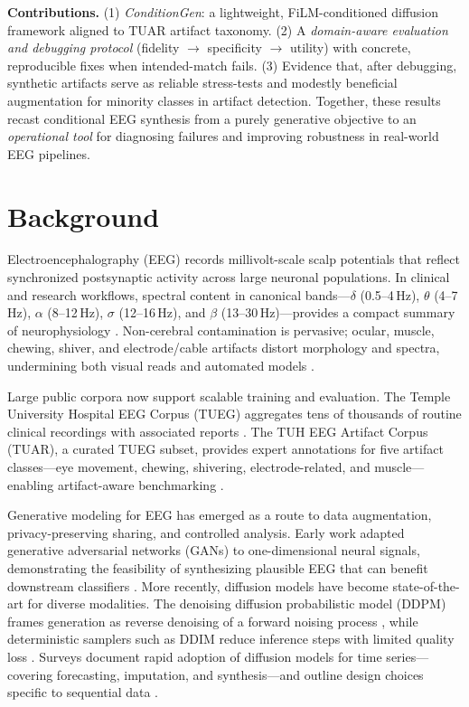 \documentclass{article}
\begin{document}
\textbf{Contributions.} (1) \emph{ConditionGen}: a lightweight, FiLM-conditioned diffusion framework aligned to TUAR artifact taxonomy. (2) A \emph{domain-aware evaluation and debugging protocol} (fidelity \(\to\) specificity \(\to\) utility) with concrete, reproducible fixes when intended-match fails. (3) Evidence that, after debugging, synthetic artifacts serve as reliable stress-tests and modestly beneficial augmentation for minority classes in artifact detection. Together, these results recast conditional EEG synthesis from a purely generative objective to an \emph{operational tool} for diagnosing failures and improving robustness in real-world EEG pipelines.



\section{Background}

Electroencephalography (EEG) records millivolt-scale scalp potentials that reflect synchronized postsynaptic activity across large neuronal populations. In clinical and research workflows, spectral content in canonical bands—\(\delta\) (0.5--4\,Hz), \(\theta\) (4--7\,Hz), \(\alpha\) (8--12\,Hz), \(\sigma\) (12--16\,Hz), and \(\beta\) (13--30\,Hz)—provides a compact summary of neurophysiology \citep{nayak2023statpearls}. Non-cerebral contamination is pervasive; ocular, muscle, chewing, shiver, and electrode/cable artifacts distort morphology and spectra, undermining both visual reads and automated models \citep{jiang2019artifactreview}.

Large public corpora now support scalable training and evaluation. The Temple University Hospital EEG Corpus (TUEG) aggregates tens of thousands of routine clinical recordings with associated reports \citep{obeid2016tueg}. The TUH EEG Artifact Corpus (TUAR), a curated TUEG subset, provides expert annotations for five artifact classes—eye movement, chewing, shivering, electrode-related, and muscle—enabling artifact-aware benchmarking \citep{hamid2020tuar}.

Generative modeling for EEG has emerged as a route to data augmentation, privacy-preserving sharing, and controlled analysis. Early work adapted generative adversarial networks (GANs) to one-dimensional neural signals, demonstrating the feasibility of synthesizing plausible EEG that can benefit downstream classifiers \citep{hartmann2018eeggan}. More recently, diffusion models have become state-of-the-art for diverse modalities. The denoising diffusion probabilistic model (DDPM) frames generation as reverse denoising of a forward noising process \citep{ho2020ddpm}, while deterministic samplers such as DDIM reduce inference steps with limited quality loss \citep{song2020ddim}. Surveys document rapid adoption of diffusion models for time series—covering forecasting, imputation, and synthesis—and outline design choices specific to sequential data \citep{lin2023tsdiffusionsurvey}.
\end{document}
